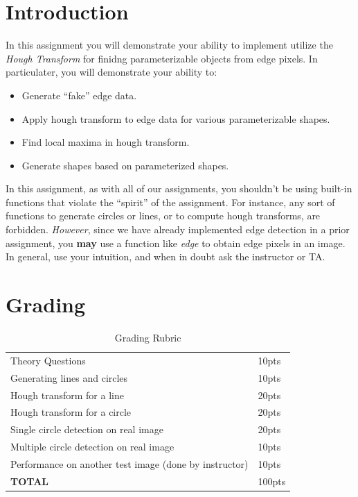 \documentclass[12pt]{article}
\begin{document}
\maketitle


\section*{Introduction}
In this assignment you will demonstrate your ability to implement utilize the \emph{Hough Transform} for finidng parameterizable objects from edge pixels.  In particulater, you will demonstrate your ability to:
\begin{itemize}
\item Generate ``fake'' edge data.
\item Apply hough transform to edge data for various parameterizable shapes.
\item Find local maxima in hough transform.
\item Generate shapes based on parameterized shapes.
\end{itemize}

\noindent
In this assignment, as with all of our assignments, you shouldn't be using built-in functions that violate the ``spirit'' of the assignment.  For instance, any sort of functions to generate circles or lines, or to compute hough transforms, are forbidden.  \emph{However}, since we have already implemented edge detection in a prior assignment, you \textbf{may} use a function like \emph{edge} to obtain edge pixels in an image.  In general, use your intuition, and when in doubt ask the instructor or TA.\\

\section*{Grading}
\begin{table}[h]
\begin{centering}
\begin{tabular}{|l|l|}
\hline
Theory Questions & 10pts \\
Generating lines and circles & 10pts\\
Hough transform for a line & 20pts\\
Hough transform for a circle & 20pts\\
Single circle detection on real image & 20pts\\
Multiple circle detection on real image & 10pts\\
Performance on another test image (done by instructor) & 10pts\\
\hline
\textbf{TOTAL} & 100pts\\
\hline
\end{tabular}
\caption{Grading Rubric}
\end{centering}
\end{table}
\end{document}
